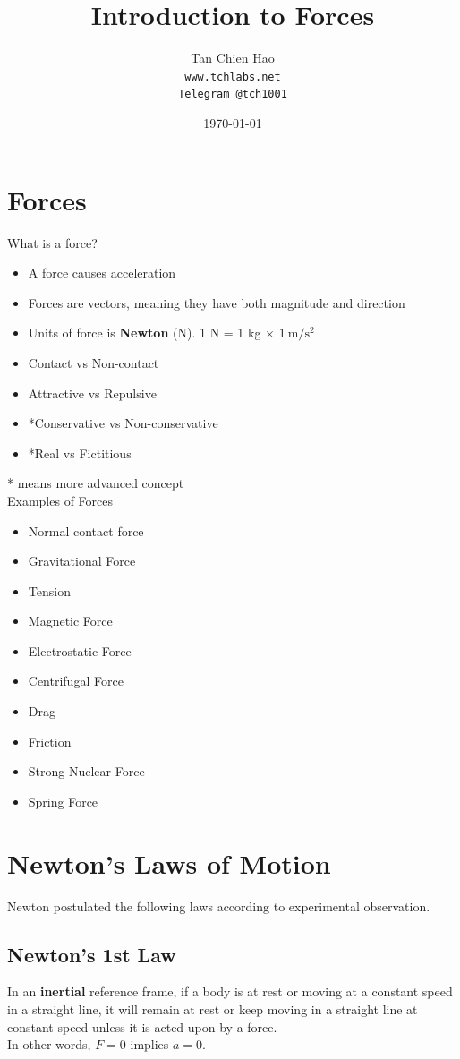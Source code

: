 \documentclass{article}
\title{Introduction to Forces}
\author{
    Tan Chien Hao\\
    \texttt{www.tchlabs.net}\\
    \texttt{Telegram @tch1001}
}
\date{\today}
\begin{document}
\newif\ifpaper

\paperfalse 

\maketitle
\section{Forces}
What is a force?
\begin{itemize}
    \item A force causes acceleration
    \item Forces are vectors, meaning they have both magnitude and direction
    \item Units of force is \textbf{Newton} (N). 1 N = 1 kg $\times$ $1\mathrm{~m} / \mathrm{s}^2$
    \item Contact vs Non-contact
    \item Attractive vs Repulsive
    \item *Conservative vs Non-conservative
    \item *Real vs Fictitious
\end{itemize}
* means more advanced concept\\[10pt]
\noindent Examples of Forces
\begin{itemize}
    \item Normal contact force
    \item Gravitational Force
    \item Tension
    \item Magnetic Force
    \item Electrostatic Force
    \item Centrifugal Force
    \item Drag 
    \item Friction
    \item Strong Nuclear Force
    \item Spring Force
\end{itemize}

\section{Newton's Laws of Motion}
Newton postulated the following laws according to experimental observation.

\subsection{Newton's 1st Law}
In an \textbf{inertial} reference frame, if a body is at rest or moving at a constant speed in a straight line, it will remain at rest or keep moving in a straight line at constant speed unless it is acted upon by a force. \\[10pt]
\noindent In other words, $F = 0$ implies $a = 0$. 
\end{document}
